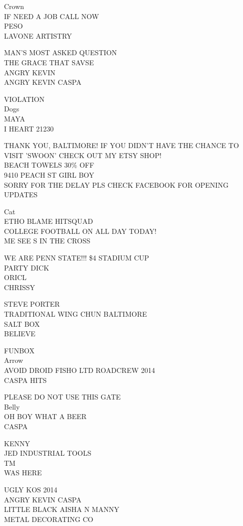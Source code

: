 \documentclass[10pt,letterpaper]{article}
\begin{document}
Crown\\
IF NEED A JOB CALL NOW\\
PESO\\
LAVONE ARTISTRY

MAN'S MOST ASKED QUESTION\\
THE GRACE THAT SAVSE\\
ANGRY KEVIN\\
ANGRY KEVIN CASPA

VIOLATION\\
Dogs\\
MAYA\\
I HEART 21230

THANK YOU, BALTIMORE!  IF YOU DIDN'T HAVE THE CHANCE TO VISIT 'SWOON' CHECK OUT MY ETSY SHOP!\\
BEACH TOWELS 30\% OFF\\
9410 PEACH ST GIRL BOY\\
SORRY FOR THE DELAY PLS CHECK FACEBOOK FOR OPENING UPDATES

Cat\\
ETHO BLAME HITSQUAD\\
COLLEGE FOOTBALL ON ALL DAY TODAY!\\
ME SEE S IN THE CROSS

WE ARE PENN STATE!!! \$4 STADIUM CUP\\
PARTY DICK\\
ORICL\\
CHRISSY

STEVE PORTER\\
TRADITIONAL WING CHUN BALTIMORE\\
SALT BOX\\
BELIEVE

FUNBOX\\
Arrow\\
AVOID DROID FISHO LTD ROADCREW 2014\\
CASPA HITS

PLEASE DO NOT USE THIS GATE\\
Belly\\
OH BOY WHAT A BEER\\
CASPA

KENNY\\
JED INDUSTRIAL TOOLS\\
TM\\
WAS HERE

UGLY KOS 2014\\
ANGRY KEVIN CASPA\\
LITTLE BLACK AISHA N MANNY\\
METAL DECORATING CO
\end{document}
